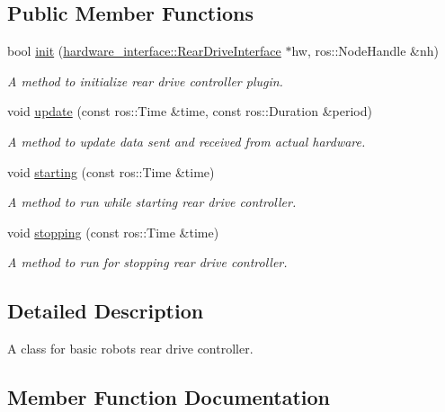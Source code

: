 \subsection*{Public Member Functions}
\begin{DoxyCompactItemize}
\item 
bool \hyperlink{classRearDriveController_a024870a0ca82fd44acd0b2b9f2d7e580}{init} (\hyperlink{classhardware__interface_1_1RearDriveInterface}{hardware\+\_\+interface\+::\+Rear\+Drive\+Interface} $\ast$hw, ros\+::\+Node\+Handle \&nh)
\begin{DoxyCompactList}\small\item\em A method to initialize rear drive controller plugin. \end{DoxyCompactList}\item 
void \hyperlink{classRearDriveController_a1990896d6d56922ed2f0d3097a9ea5e4}{update} (const ros\+::\+Time \&time, const ros\+::\+Duration \&period)
\begin{DoxyCompactList}\small\item\em A method to update data sent and received from actual hardware. \end{DoxyCompactList}\item 
void \hyperlink{classRearDriveController_a62dd1436e6ad485642378d7cb65b9960}{starting} (const ros\+::\+Time \&time)
\begin{DoxyCompactList}\small\item\em A method to run while starting rear drive controller. \end{DoxyCompactList}\item 
void \hyperlink{classRearDriveController_a1b3be0cdac62e66726dbe0500008de24}{stopping} (const ros\+::\+Time \&time)
\begin{DoxyCompactList}\small\item\em A method to run for stopping rear drive controller. \end{DoxyCompactList}\end{DoxyCompactItemize}


\subsection{Detailed Description}
A class for basic robot\textquotesingle{}s rear drive controller. 

\subsection{Member Function Documentation}
\mbox{\label{classRearDriveController_a024870a0ca82fd44acd0b2b9f2d7e580}} 
